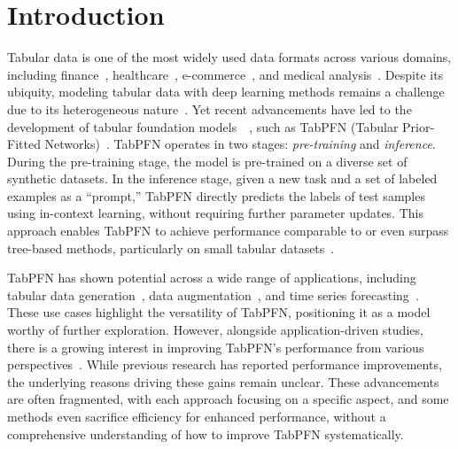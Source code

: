 
\section{Introduction}
\label{sec:intro} 
Tabular data is one of the most widely used data formats across various domains, including finance~\cite{Financial_SVM}, healthcare~\cite{HassanAHK20}, e-commerce~\cite{nederstigt2014floppies}, and medical analysis~\cite{schwartz2007drug,subasi2012medical}. Despite its ubiquity, modeling tabular data with deep learning methods remains a challenge due to its heterogeneous nature~\cite{BorisovLSHPK24TabularSurvey}. 
Yet recent advancements have led to the development of tabular foundation models~\cite{WhyTFM}~, such as TabPFN (Tabular Prior-Fitted Networks)~\cite{Hollmann2022TabPFN,hollmann2025tabpfn}. TabPFN operates in two stages: \textit{pre-training} and \textit{inference}. During the pre-training stage, the model is pre-trained on a diverse set of synthetic datasets. In the inference stage, given a new task and a set of labeled examples as a ``prompt,'' TabPFN directly predicts the labels of test samples using in-context learning, without requiring further parameter updates. This approach enables TabPFN to achieve performance comparable to or even surpass tree-based methods, particularly on small tabular datasets~\cite{McElfreshKVCRGW23when}. %


 
TabPFN has shown potential across a wide range of applications, including tabular data generation~\cite{TabPFGen}, data augmentation~\cite{TabMDA}, and time series forecasting~\cite{TabPFN-TS}. These use cases highlight the versatility of TabPFN, positioning it as a model worthy of further exploration. However, alongside application-driven studies, there is a growing interest in improving TabPFN's performance from various perspectives~\cite{TuneTables,LocalPFN,MixturePFN,TabForestPFN,MaTabDPT}. While previous research has reported performance improvements, the underlying reasons driving these gains remain unclear.  
These advancements are often fragmented, with each approach focusing on a specific aspect, and some methods even sacrifice efficiency for enhanced performance, without a comprehensive understanding of how to improve TabPFN systematically.

